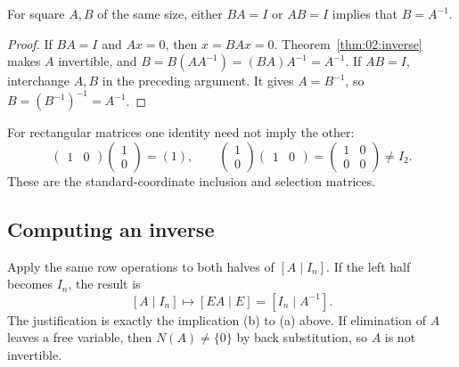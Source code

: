 \begin{proposition}\label{prop:02:one-sided}
For square \(A,B\) of the same size, either \(BA=I\) or \(AB=I\)
implies that \(B=A^{-1}\).
\end{proposition}
\begin{proof}
If \(BA=I\) and \(Ax=0\), then \(x=BAx=0\).
Theorem~\ref{thm:02:inverse} makes \(A\) invertible, and
\(B=B(AA^{-1})=(BA)A^{-1}=A^{-1}\).
If \(AB=I\), interchange \(A,B\) in the preceding argument. It gives
\(A=B^{-1}\), so \(B=(B^{-1})^{-1}=A^{-1}\).
\end{proof}
For rectangular matrices one identity need not imply the other:
\[
\begin{pmatrix}1&0\end{pmatrix}\begin{pmatrix}1\\0\end{pmatrix}=(1),
\qquad
\begin{pmatrix}1\\0\end{pmatrix}\begin{pmatrix}1&0\end{pmatrix}
=\begin{pmatrix}1&0\\0&0\end{pmatrix}\ne I_2.
\]
These are the standard-coordinate inclusion and selection matrices.

\subsection*{Computing an inverse}
Apply the same row operations to both halves of \([A\mid I_n]\).
If the left half becomes \(I_n\), the result is
\[
[A\mid I_n]\longmapsto[EA\mid E]=[I_n\mid A^{-1}].
\]
The justification is exactly the implication (b) to (a) above.
If elimination of \(A\) leaves a free variable, then \(N(A)\ne\{0\}\)
by back substitution, so \(A\) is not invertible.

